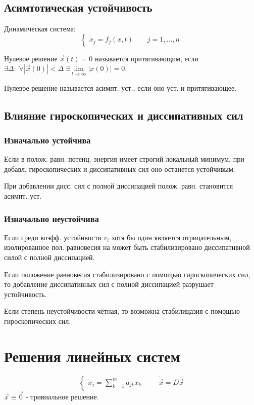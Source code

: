 \documentclass{article}
\begin{document}
\subsection{Асимтотическая устойчивость}
Динамическая система:
\[
  \left\{\begin{aligned}
    \dot{x}_j=f_j(x,t) \qquad j=1,\dots ,n
  \end{aligned}\right.
\]
\begin{definition}
  Нулевое решение $\vec{x}(t)=0$ называется притягивающим,
  если $\exists \Delta: \; \forall |\vec{x}(0)|<\Delta \; \exists \lim \limits_{t\to\infty}|x(0)|=0$.
\end{definition}
\begin{definition}
  Нулевое решение называется асимпт. уст., если оно уст. и притягивающее.
\end{definition}


\subsection{Влияние гироскопических и диссипативных сил}
\subsubsection{Изначально устойчива}
Если в полож. равн. потенц. энергия  имеет строгий локальный минимум,
при добавл. гироскопических  и диссипативных сил оно останется устойчивым.  

При добавлении дисс. сил с полной диссипацией  полож. равн. становится асимпт. уст. 
\subsubsection{Изначально неустойчива}
Если среди коэфф. устойивости $r_i$ хотя бы один является отрицательным,
изолированное пол. равновесия на может быть стабилизировано
диссипативной силой с полной диссипацией.

Если положение равновесия стабилизировано с помощью гироскопических сил,
то добавление диссипативных сил с полной диссипацией разрушает устойчивость.

Если степень неустойчивости чётная, то возможна стабилицазия с помощью
гироскопических сил.

\section{Решения линейных систем}
\[
  \left\{\begin{aligned}
      \dot{x}_j=\sum_{k=1}^{m}a_{jk}x_k
  \end{aligned}\right. \qquad \dot{\vec{x}}=D\vec{x}
\]
$\vec{x}\equiv \vec{0}$ - тривиальное решение.
\end{document}
